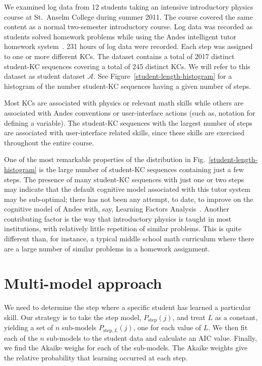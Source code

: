 \documentclass{edm_template}
\begin{document}
We examined log data from 12 students taking an intensive introductory
physics course at St.\ Anselm College during summer 2011.  The course
covered the same content as a normal two-semester introductory course.
Log data was recorded as students solved homework problems while using
the Andes intelligent tutor homework system~\cite{vanlehn_andes_2005}.  
231 hours of log data were recorded.
Each step was assigned to one or more different KCs.  The dataset
contains a total of 2017 distinct student-KC sequences covering a total of
245 distinct KCs.  We will refer to this dataset as student dataset
$\mathcal{A}$.  See Figure~\ref{student-length-histogram} for a
histogram of the number student-KC sequences having a given number of
steps.

Most KCs are associated with physics
or relevant math skills while others are associated with 
Andes conventions or user-interface actions (such as, notation
for defining a variable).  The student-KC sequences with the largest 
number of steps are associated with user-interface related skills,
since these skills are exercised throughout the entire course. 

One of the most remarkable properties of the distribution in
Fig.~\ref{student-length-histogram} is the large number of
student-KC sequences containing just a few steps.
The presence of many student-KC sequences with just one or two
steps may indicate that the default cognitive model associated 
with this tutor system may be sub-optimal; there has not 
been any attempt, to date, to improve on the cognitive model of 
Andes with, say, Learning Factors Analysis~\cite{cen_learning_2006}.
Another contributing factor is the way that introductory physics is 
taught in most institutions, with relatively little repetition of 
similar problems.  This is quite different than, for instance, 
a typical middle school math curriculum where there are a large number
of similar problems in a homework assignment.



\section{Multi-model approach}
\label{multi-model}

We need to determine the step where a specific student has learned a
particular skill.  Our strategy is to take the step model, 
$P_\mathrm{step}(j)$, and treat $L$ as a constant, yielding a set of $n$ 
sub-models $P_{\mathrm{step},L}(j)$, one for each value of $L$.
We then fit each of the $n$ sub-models to the student data and
calculate an AIC value.  Finally, we find the Akaike weighs for each of the
sub-models.  The Akaike weights give the relative probability that learning
occurred at each step.
\end{document}
